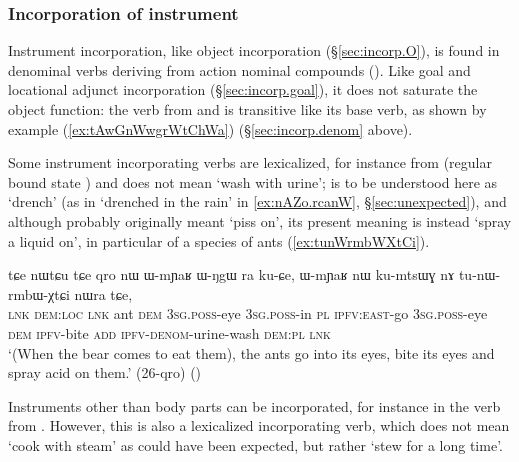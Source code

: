 \subsubsection{Incorporation of instrument} \label{sec:incorp.instr}
Instrument incorporation, like object incorporation (§\ref{sec:incorp.O}), is found in denominal verbs deriving from action nominal compounds (). Like goal and locational adjunct incorporation (§\ref{sec:incorp.goal}), it does not saturate the object function: the verb  from  and  is transitive like its base verb, as shown by example (\ref{ex:tAwGnWwgrWtChWa}) (§\ref{sec:incorp.denom} above).

Some instrument incorporating verbs are lexicalized, for instance  from  (regular bound state ) and  does not mean `wash with urine';  is to be understood here as `drench' (as in `drenched in the rain' in \ref{ex:nAZo.rcanW}, §\ref{sec:unexpected}), and although  probably originally meant `piss on', its present meaning is instead `spray a liquid on', in particular of a species of ants (\ref{ex:tunWrmbWXtCi}).

\begin{exe}
\ex \label{ex:tunWrmbWXtCi}
\gll tɕe nɯtɕu tɕe qro nɯ ɯ-mɲaʁ ɯ-ŋgɯ ra ku-ɕe, ɯ-mɲaʁ nɯ ku-mtsɯɣ nɤ tu-nɯ-rmbɯ-χtɕi nɯra tɕe, \\
\textsc{lnk} \textsc{dem}:\textsc{loc} \textsc{lnk} ant \textsc{dem} \textsc{3sg}.\textsc{poss}-eye \textsc{3sg}.\textsc{poss}-in \textsc{pl} \textsc{ipfv}:\textsc{east}-go \textsc{3sg}.\textsc{poss}-eye \textsc{dem} \textsc{ipfv}-bite \textsc{add} \textsc{ipfv}-\textsc{denom}-urine-wash \textsc{dem}:\textsc{pl} \textsc{lnk}  \\
\glt `(When the bear comes to eat them), the ants go into its eyes, bite its eyes and spray acid on them.' (26-qro)
()
\end{exe}

Instruments other than body parts can be incorporated, for instance  in the verb  from . However, this is also a lexicalized incorporating verb, which does not mean `cook with steam' as could have been expected, but rather `stew for a long time'. 



